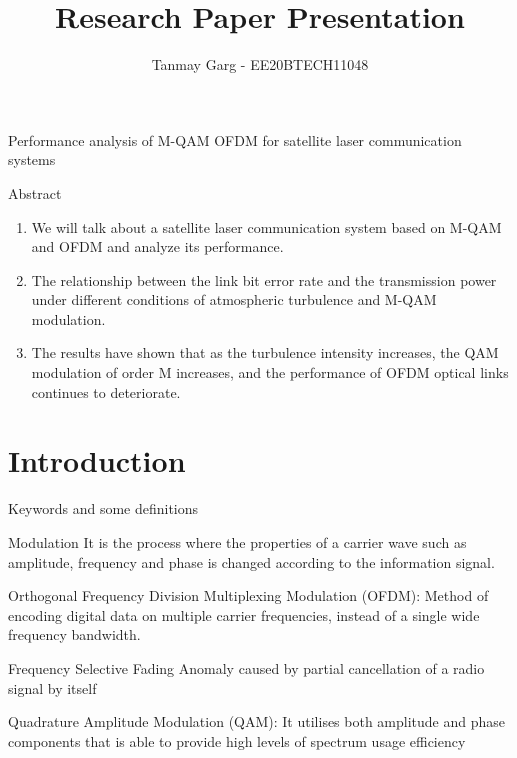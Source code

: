 \documentclass{beamer}
\title{Research Paper Presentation}
\author{Tanmay Garg - EE20BTECH11048}
\begin{document}
\begin{frame}
\titlepage
\end{frame}
\section{}
\begin{frame}{Performance analysis of M-QAM OFDM for satellite laser communication systems}
\begin{block}{Abstract}
\begin{enumerate}
    \item We will talk about a satellite laser communication system based on M-QAM and OFDM and analyze its performance.
    \item The relationship between the link bit error rate and the transmission power under different conditions of atmospheric turbulence and M-QAM modulation.
    \item The results have shown that as the turbulence intensity increases, the QAM modulation of order M increases, and the performance of OFDM optical links continues to deteriorate.
\end{enumerate}

\end{block}
\end{frame}
\section{Introduction}
\begin{frame}{Keywords and some definitions}
\begin{block}{Modulation}
   It is the process where the properties of a carrier wave such as amplitude, frequency and phase is changed according to the information signal.
\end{block}
    \begin{block}{Orthogonal Frequency Division Multiplexing Modulation (OFDM):}
   Method of encoding digital data on multiple carrier frequencies, instead of a single wide frequency bandwidth.
    \end{block}
    \begin{block}{Frequency Selective Fading}
     Anomaly caused by partial cancellation of a radio signal by itself
    \end{block}
    \begin{block}{Quadrature Amplitude Modulation (QAM):}
       It utilises both amplitude and phase components that is able to provide high levels of spectrum usage efficiency
    \end{block}
\end{frame}
\end{document}
